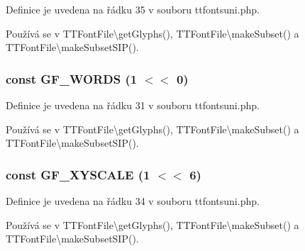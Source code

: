 Definice je uvedena na řádku 35 v souboru ttfontsuni.\-php.



Používá se v T\-T\-Font\-File\textbackslash{}get\-Glyphs(), T\-T\-Font\-File\textbackslash{}make\-Subset() a T\-T\-Font\-File\textbackslash{}make\-Subset\-S\-I\-P().

\hypertarget{ttfontsuni_8php_aae20fb5dea4be83872819907d66f0e93}{
\subsubsection[{G\-F\-\_\-\-W\-O\-R\-D\-S}]{\setlength{\rightskip}{0pt plus 5cm}const G\-F\-\_\-\-W\-O\-R\-D\-S (1 $<$$<$ 0)}}\label{ttfontsuni_8php_aae20fb5dea4be83872819907d66f0e93}


Definice je uvedena na řádku 31 v souboru ttfontsuni.\-php.



Používá se v T\-T\-Font\-File\textbackslash{}get\-Glyphs(), T\-T\-Font\-File\textbackslash{}make\-Subset() a T\-T\-Font\-File\textbackslash{}make\-Subset\-S\-I\-P().

\hypertarget{ttfontsuni_8php_a6473563f89e8745ec18dc7b071ec35dd}{
\subsubsection[{G\-F\-\_\-\-X\-Y\-S\-C\-A\-L\-E}]{\setlength{\rightskip}{0pt plus 5cm}const G\-F\-\_\-\-X\-Y\-S\-C\-A\-L\-E (1 $<$$<$ 6)}}\label{ttfontsuni_8php_a6473563f89e8745ec18dc7b071ec35dd}


Definice je uvedena na řádku 34 v souboru ttfontsuni.\-php.



Používá se v T\-T\-Font\-File\textbackslash{}get\-Glyphs(), T\-T\-Font\-File\textbackslash{}make\-Subset() a T\-T\-Font\-File\textbackslash{}make\-Subset\-S\-I\-P().

